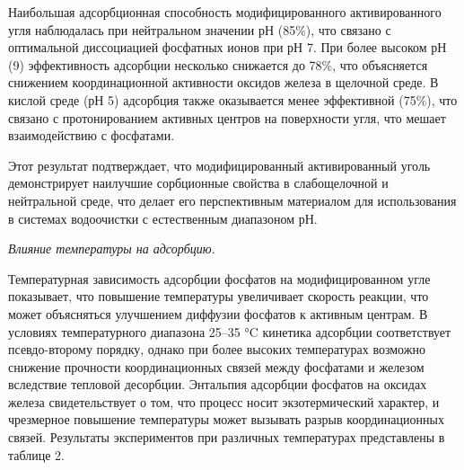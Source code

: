 
Наибольшая адсорбционная способность модифицированного активированного
угля наблюдалась при нейтральном значении рН (85\%), что связано с
оптимальной диссоциацией фосфатных ионов при рН 7. При более высоком рН
(9) эффективность адсорбции несколько снижается до 78\%, что объясняется
снижением координационной активности оксидов железа в щелочной среде. В
кислой среде (рН 5) адсорбция также оказывается менее эффективной
(75\%), что связано с протонированием активных центров на поверхности
угля, что мешает взаимодействию с фосфатами.

Этот результат подтверждает, что модифицированный активированный уголь
демонстрирует наилучшие сорбционные свойства в слабощелочной и
нейтральной среде, что делает его перспективным материалом для
использования в системах водоочистки с естественным диапазоном рН.

\emph{Влияние температуры на адсорбцию.}

Температурная зависимость адсорбции фосфатов на модифицированном угле
показывает, что повышение температуры увеличивает скорость реакции, что
может объясняться улучшением диффузии фосфатов к активным центрам. В
условиях температурного диапазона 25--35 °C кинетика адсорбции
соответствует псевдо-второму порядку, однако при более высоких
температурах возможно снижение прочности координационных связей между
фосфатами и железом вследствие тепловой десорбции. Энтальпия адсорбции
фосфатов на оксидах железа свидетельствует о том, что процесс носит
экзотермический характер, и чрезмерное повышение температуры может
вызывать разрыв координационных связей. Результаты экспериментов при
различных температурах представлены в таблице 2.

